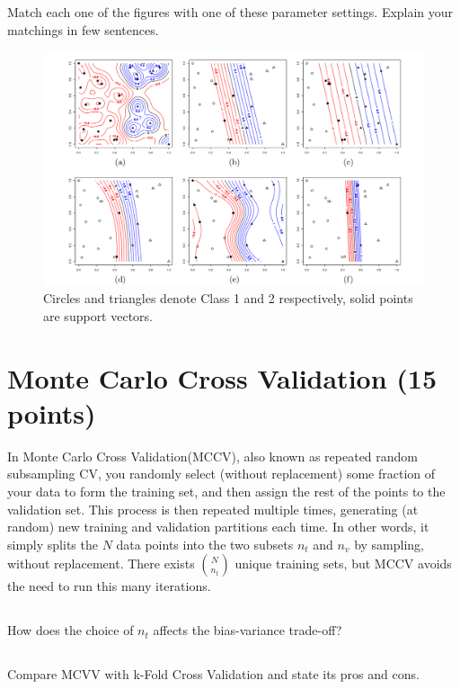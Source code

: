 \documentclass[a4paper]{article}
\begin{document}
	Match each one of the figures with one of these parameter settings. Explain your matchings in few sentences.

	\begin{figure}
		[hbt!]
		\centering
		\includegraphics[scale=0.36]{Figure2.png}
		\caption{Circles and triangles denote Class 1 and 2 respectively, solid points are support vectors.}
	\end{figure}

        \section{Monte Carlo Cross Validation (15 points)}
        In Monte Carlo Cross Validation(MCCV), also known as repeated random subsampling CV, you randomly select (without replacement) some fraction of your data to form the training set, and then assign the rest of the points to the validation set. This process is then repeated multiple times, generating (at random) new training and validation partitions each time. In other words, it simply splits the $N$ data points into the two subsets $n_t$ and $n_v$ by sampling, without replacement. There exists $N \choose n_t$ unique training sets, but MCCV avoids the need to run this many iterations.

        \subsection{}
        How does the choice of $n_t$ affects the bias-variance trade-off?
        \subsection{}
        Compare MCVV with k-Fold Cross Validation and state its pros and cons.
        
	
\end{document}
